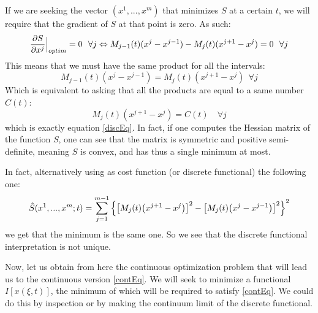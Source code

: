 \documentclass[11pt, a4paper]{article} %
\begin{document}
If we are seeking the vector $(x^1,...,x^m)$ that minimizes $S$ at a certain $t$, we will require that the gradient of $S$ at that point is zero. As such:
\begin{equation}
\pdv{S}{x^j}\Big\rvert_{optim}=0\ \ \forall j\Leftrightarrow M_{j-1}(t)(x^j-x^{j-1})-M_j(t)(x^{j+1}-x^j)=0\ \ \forall j
\end{equation}
This means that we must have the same product for all the intervals:
\begin{equation}
 M_{j-1}(t)(x^j-x^{j-1})=M_j(t)(x^{j+1}-x^j)\ \ \forall j
\end{equation}
Which is equivalent to asking that all the products are equal to a same number $C(t)$:
\begin{equation}
M_j(t)(x^{j+1}-x^j)=C(t) \quad \forall j
\end{equation}
which is exactly equation \eqref{discEq}. In fact, if one computes the Hessian matrix of the function $S$, one can see that the matrix is symmetric and positive semi-definite, meaning $S$ is convex, and has thus a single minimum at most. 

In fact, alternatively using as cost function (or discrete functional) the following one:
\begin{equation}
\hat{S}(x^1,...,x^m;t)=\sum_{j=1}^{m-1} \qty{\qty[ M_j(t) \qty(x^{j+1}-x^j)]^2-\qty[ M_j(t) \qty(x^{j}-x^{j-1})]^2}^2
\end{equation}
we get that the minimum is the same one. So we see that the discrete functional interpretation is not unique.

Now, let us obtain from here the continuous optimization problem that will lead us to the continuous version \eqref{contEq}. We will seek to minimize a functional $I[x(\xi,t)]$, the minimum of which will be required to satisfy \eqref{contEq}. We could do this by inspection or by making the continuum limit of the discrete functional.
\end{document}
